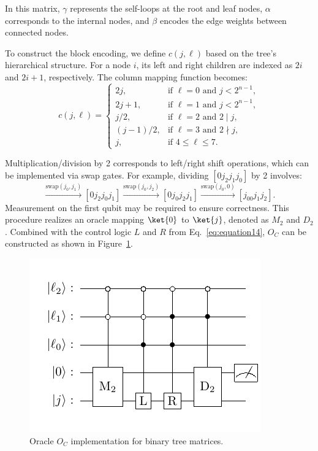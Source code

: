\documentclass{article}
\begin{document}
In this matrix, $\gamma$ represents the self-loops at the root and leaf nodes, $\alpha$ corresponds to the internal nodes, and $\beta$ encodes the edge weights between connected nodes.

To construct the block encoding, we define $c(j, \ell)$ based on the tree's hierarchical structure. For a node $i$, its left and right children are indexed as $2i$ and $2i+1$, respectively. The column mapping function becomes:
\begin{equation}
  c(j, \ell) =
  \begin{cases}
    2j, & \text{if } \ell = 0 \text{ and } j < 2^{n-1},\\
    2j + 1, & \text{if } \ell = 1 \text{ and } j < 2^{n-1},\\
    j/2, & \text{if } \ell = 2 \text{ and } 2 \mid j,\\
    (j-1)/2, & \text{if } \ell = 3 \text{ and } 2 \nmid j,\\
    j, & \text{if } 4 \leq \ell \leq 7.
  \end{cases}\label{eq:equation17}
\end{equation}

Multiplication/division by 2 corresponds to left/right shift operations, which can be implemented via swap gates. For example, dividing $[0j_2j_1j_0]$ by 2 involves:
\begin{equation}
  [0j_2j_1j_0] 
  \xrightarrow{\text{swap}(j_0,j_1)} [0j_2j_0j_1] 
  \xrightarrow{\text{swap}(j_0,j_2)} [0j_0j_2j_1] 
  \xrightarrow{\text{swap}(j_0,0)} [j_00j_1j_2].
\end{equation}
Measurement on the first qubit may be required to ensure correctness. This procedure realizes an oracle mapping $\ket{0}$ to $\ket{j}$, denoted as $M_2$ and $D_2$. Combined with the control logic $L$ and $R$ from Eq.~\eqref{eq:equation14}, $O_C$ can be constructed as shown in Figure~\ref{fig:tree_oc}.

\begin{figure}[htbp]
  \centering
  \includegraphics{pdf/tree_oc}
  \caption{Oracle $O_C$ implementation for binary tree matrices.}
  \label{fig:tree_oc}
\end{figure}
\end{document}
